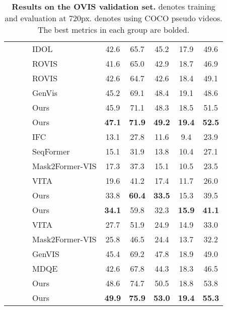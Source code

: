 \documentclass[10pt,twocolumn,letterpaper]{article}
\begin{document}
\begin{table}[t]
\begin{tabular}{l|l|l|ccccc}
	~ & ~ & IDOL \cite{idol} & 42.6 & 65.7 & 45.2 & 17.9 & 49.6 \\
	~ & ~ & ROVIS \cite{rovis}& 41.6 & 65.0 & 42.9 & 18.7 & 46.9 \\
	~ & ~ & ROVIS \cite{rovis} & 42.6 & 64.7 & 42.6 & 18.4 & 49.1 \\
	~ & ~ & GenVis \cite{genvis} & 45.2 & 69.1 & 48.4 & 19.1 & 48.6 \\
	~ & ~ & Ours & 45.9 & 71.1 & 48.3 & 18.5 & 51.5 \\
	~ & ~ & Ours & \textbf{47.1} & \textbf{71.9} & \textbf{49.2} & \textbf{19.4} & \textbf{52.5} \\
	\hline 
	\multirow{12}{*}{\rotatebox{90}{Offline}} & \multirow{7}{*}{\rotatebox{90}{ResNet50}} & IFC \cite{ifc} & 13.1 & 27.8 & 11.6 & 9.4 & 23.9 \\
	~ & ~ & SeqFormer \cite{seqformer}& 15.1 & 31.9 & 13.8 & 10.4 & 27.1 \\
	~ & ~ & Mask2Former-VIS \cite{mask2formervis}& 17.3 & 37.3 & 15.1 & 10.5 & 23.5 \\
	~ & ~ & VITA \cite{vita} & 19.6 & 41.2 & 17.4 & 11.7 & 26.0 \\
~ & ~ & Ours & 33.8 & \textbf{60.4} & \textbf{33.5} & 15.3 & 39.5 \\
	~ & ~ & Ours & \textbf{34.1} & 59.8 & 32.3 & \textbf{15.9} & \textbf{41.1} \\
	\cline{2-8}
	~ & \multirow{7}{*}{\rotatebox{90}{Swin-L}} & VITA \cite{vita} & 27.7 & 51.9 & 24.9 & 14.9 & 33.0 \\
	~ & ~ & Mask2Former-VIS \cite{mask2formervis}& 25.8 & 46.5 & 24.4 & 13.7 & 32.2 \\
	~ & ~ & GenVIS \cite{genvis} & 45.4 & 69.2 & 47.8 & 18.9 & 49.0 \\
    ~ & ~ & MDQE \cite{mdqe} & 42.6 & 67.8 & 44.3 & 18.3 & 46.5 \\
	~ & ~ & Ours & 48.6 & 74.7 & 50.5 & 18.8 & 53.8 \\
	~ & ~ & Ours & \textbf{49.9} & \textbf{75.9} & \textbf{53.0} & \textbf{19.4} & \textbf{55.3} \\	
	\hline
 \end{tabular}
 \caption{\textbf{Results on the OVIS validation set.}  denotes training and evaluation at 720px.  denotes using COCO pseudo videos. The best metrics in each group are bolded.}\vspace{-6mm}
 \label{tab:ovis}
\end{table}
\end{document}
